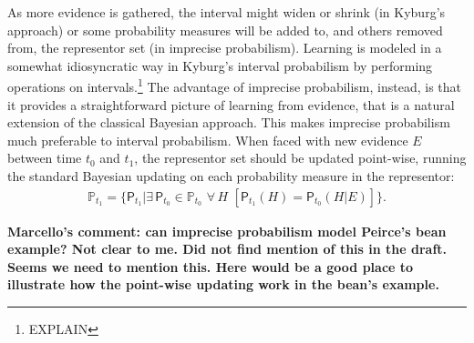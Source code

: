 \documentclass[
  10pt,
  dvipsnames,enabledeprecatedfontcommands]{scrartcl}
\begin{document}
As more evidence is gathered, the interval might widen or shrink (in
Kyburg's approach) or some probability measures will be added to, and
others removed from, the representor set (in imprecise probabilism).
Learning is modeled in a somewhat idiosyncratic way in Kyburg's interval
probabilism by performing operations on intervals.\footnote{EXPLAIN} The
advantage of imprecise probabilism, instead, is that it provides a
straightforward picture of learning from evidence, that is a natural
extension of the classical Bayesian approach. This makes imprecise
probabilism much preferable to interval probabilism. When faced with new
evidence \(E\) between time \(t_0\) and \(t_1\), the representor set
should be updated point-wise, running the standard Bayesian updating on
each probability measure in the representor:
\begin{align*} \label{eq:updateRepresentor}
\mathbb{P}_{t_1} = \{\mathsf{P}_{t_1}\vert \exists\, {\mathsf{P}_{t_0} \!\in  \mathbb{P}_{t_0}}\,\, \forall\, {H}\,\, \left[\mathsf{P}_{t_1}(H)=\mathsf{P}_{t_0}(H \vert E)\right] \}.
\end{align*}

\textbf{Marcello's comment: can imprecise probabilism model Peirce's bean example?  Not clear to me. Did not find mention of this in the draft. Seems we need to mention this. Here would be a good place to illustrate how the point-wise updating work in the bean's example.}
\end{document}
